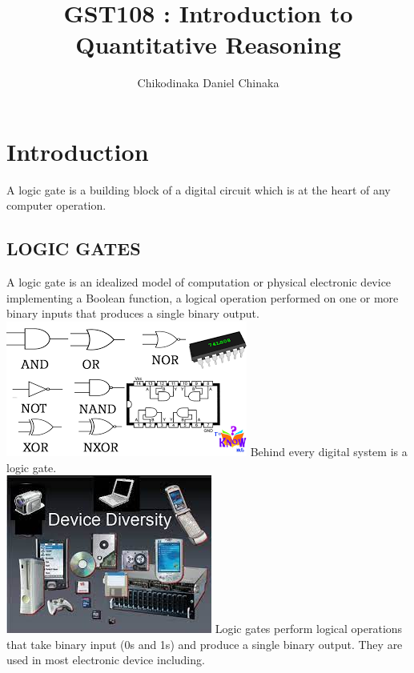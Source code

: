 \documentclass{article}
\begin{document}
 \title{GST108 : Introduction to Quantitative Reasoning}

\author{Chikodinaka Daniel Chinaka}
\maketitle
\newpage
\tableofcontents
\centering
\newpage
\Large

\section{Introduction}
A logic gate is a building block of a digital circuit which is at the heart of any computer operation.
\\
\subsection{LOGIC GATES}
A logic gate is an idealized model of computation or physical electronic device implementing a Boolean function, a logical operation performed on one or more binary inputs that produces a single binary output. 
\includegraphics{unknown.png}
\newpage
Behind every digital system is a logic gate.\\
\includegraphics{unknown.jpeg}
\newpage
Logic gates perform logical operations that take binary input (0s and 1s) and produce  a single binary output. They are used in most electronic device including.\\
\end{document}

